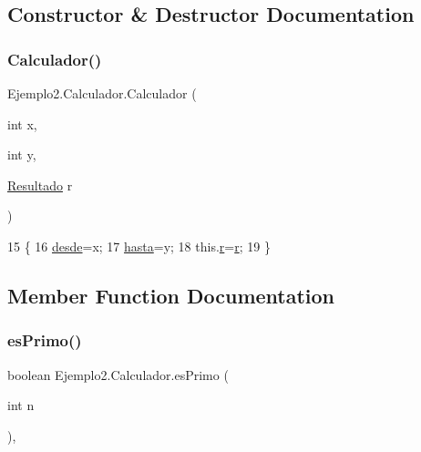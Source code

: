 \subsection{Constructor \& Destructor Documentation}
\mbox{\label{class_ejemplo2_1_1_calculador_a0e218d7f911655373271137282b54e30}} 
\subsubsection{\texorpdfstring{Calculador()}{Calculador()}}
{\footnotesize\ttfamily Ejemplo2.\+Calculador.\+Calculador (\begin{DoxyParamCaption}\item[{int}]{x,  }\item[{int}]{y,  }\item[{\mbox{\hyperlink{class_ejemplo2_1_1_resultado}{Resultado}}}]{r }\end{DoxyParamCaption})\hspace{0.3cm}{\ttfamily [inline]}}


\begin{DoxyCode}
15     \{
16         \mbox{\hyperlink{class_ejemplo2_1_1_calculador_ae17892240dfa6e7eef00191f27759d95}{desde}}=x;
17         \mbox{\hyperlink{class_ejemplo2_1_1_calculador_a8d89146305d07fda007f0cb69038c62c}{hasta}}=y;
18         this.\mbox{\hyperlink{class_ejemplo2_1_1_calculador_abca6ebfaa258c5e7c77c30751f27fb64}{r}}=\mbox{\hyperlink{class_ejemplo2_1_1_calculador_abca6ebfaa258c5e7c77c30751f27fb64}{r}};
19     \}
\end{DoxyCode}


\subsection{Member Function Documentation}
\mbox{\label{class_ejemplo2_1_1_calculador_aeef834dafd4eaa5ddebabe9b2db9b628}} 
\subsubsection{\texorpdfstring{es\+Primo()}{esPrimo()}}
{\footnotesize\ttfamily boolean Ejemplo2.\+Calculador.\+es\+Primo (\begin{DoxyParamCaption}\item[{int}]{n }\end{DoxyParamCaption})\hspace{0.3cm}{\ttfamily [inline]}, {\ttfamily [private]}}


